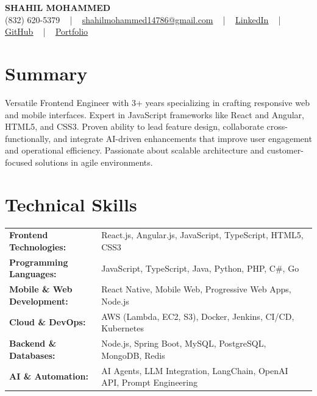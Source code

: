 \documentclass[letterpaper,11pt]{article}
\begin{document}
\begin{center}
    {\fontsize{14pt}{12pt}\selectfont \textbf{\MakeUppercase{Shahil Mohammed}}}\\ \vspace{2pt}
    \fontsize{10pt}{12pt}\selectfont (832) 620-5379 ~ | ~ \href{mailto:shahilmohammed14786@gmail.com}{shahilmohammed14786@gmail.com} ~ | ~  
    \href{https://www.linkedin.com/in/shahil-mohammed-9652931a1/}{\color{blue}\underline{LinkedIn}}  ~ | ~ 
    \href{https://github.com/freakbeast14}{\color{blue}\underline{GitHub}} ~ | ~ 
    \href{https://shahil-mohammed.netlify.app/}{\color{blue}\underline{Portfolio}}
    \vspace{-8pt}
\end{center}

\section{Summary}
\fontsize{9pt}{10pt}\selectfont
Versatile Frontend Engineer with 3+ years specializing in crafting responsive web and mobile interfaces. Expert in JavaScript frameworks like React and Angular, HTML5, and CSS3. Proven ability to lead feature design, collaborate cross-functionally, and integrate AI-driven enhancements that improve user engagement and operational efficiency. Passionate about scalable architecture and customer-focused solutions in agile environments.
 \vspace{-5pt}
 
\section{Technical Skills}
        \vspace{-14pt}
        \begin{table}[h]
            \fontsize{9pt}{10pt}\selectfont
            \begin{tabular}{p{0.3\linewidth} p{0.7\linewidth}}
                \textbf{Frontend Technologies:} & React.js, Angular.js, JavaScript, TypeScript, HTML5, CSS3 \\
                \textbf{Programming Languages:} & JavaScript, TypeScript, Java, Python, PHP, C#, Go \\
                \textbf{Mobile \& Web Development:} & React Native, Mobile Web, Progressive Web Apps, Node.js \\
                \textbf{Cloud \& DevOps:} & AWS (Lambda, EC2, S3), Docker, Jenkins, CI/CD, Kubernetes \\
                \textbf{Backend \& Databases:} & Node.js, Spring Boot, MySQL, PostgreSQL, MongoDB, Redis \\
                \textbf{AI \& Automation:} & AI Agents, LLM Integration, LangChain, OpenAI API, Prompt Engineering \\
            \end{tabular}
        \end{table}
 \vspace{-15pt}
 
\end{document}

